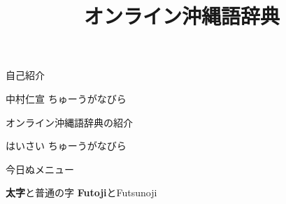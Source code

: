 \documentclass[14pt]{beamer}
\title{オンライン沖縄語辞典}
\begin{document}
\begin{frame}
  \maketitle  
\end{frame}

\begin{frame}{自己紹介}
  \begin{block}{中村仁宣}
    ちゅーうがなびら
  \end{block}
\end{frame}
\begin{frame}{オンライン沖縄語辞典の紹介}
  \begin{block}{はいさい}
    ちゅーうがなびら
  \end{block}

  \vspace{1ex}
  \begin{block}{今日ぬメニュー}
    \begin{center}
      \textbf{太字}と普通の字 \quad \textbf{Futoji}とFutsunoji
    \end{center}
  \end{block}
\end{frame}
\end{document}
